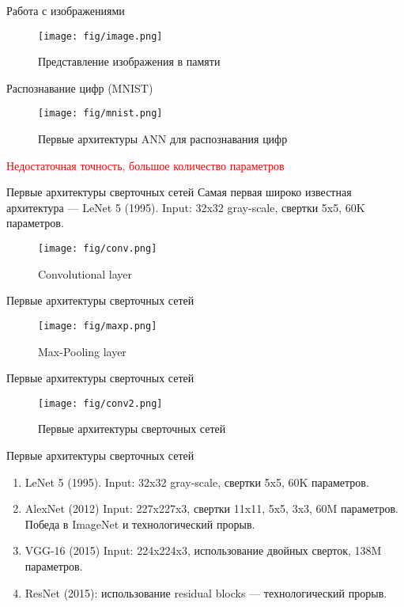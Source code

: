 \documentclass[handout]{beamer}
\begin{document}
\begin{frame}{Работа с изображениями}
	\begin{figure}
	    \texttt{[image: fig/image.png]}
	    \caption{\small Представление изображения в памяти
	    } 
	    \label{fig:w_series}
	\end{figure}
\end{frame}

\begin{frame}{Распознавание цифр (MNIST)}
	\begin{figure}
	    \texttt{[image: fig/mnist.png]}
	    \caption{\small Первые архитектуры ANN для распознавания цифр
	    } 
	    \label{fig:w_series}
	\end{figure}
	\vspace*{-10pt}
	\textcolor{red}{Недостаточная точность, большое количество параметров}
\end{frame}

\begin{frame}{Первые архитектуры сверточных сетей}
	Самая первая широко известная архитектура --- LeNet 5 (1995). Input: 32x32 gray-scale, свертки 5x5, 60K параметров.
	\begin{figure}
	    \texttt{[image: fig/conv.png]}
	    \caption{\small Convolutional layer
	    } 
	    \label{fig:w_series}
	\end{figure}
\end{frame}

\begin{frame}{Первые архитектуры сверточных сетей}
	\begin{figure}
	    \texttt{[image: fig/maxp.png]}
	    \caption{\small Max-Pooling layer
	    } 
	    \label{fig:w_series}
	\end{figure}
\end{frame}

\begin{frame}{Первые архитектуры сверточных сетей}
	\begin{figure}
	    \texttt{[image: fig/conv2.png]}
	    \caption{\small Первые архитектуры сверточных сетей
	    } 
	    \label{fig:w_series}
	\end{figure}
\end{frame}

\begin{frame}{Первые архитектуры сверточных сетей}
	\begin{enumerate}
		\item LeNet 5 (1995). Input: 32x32 gray-scale, свертки 5x5, 60K параметров.
		\item AlexNet (2012) Input: 227x227x3, свертки 11x11, 5x5, 3x3, 60M параметров. Победа в ImageNet и технологический прорыв.
		\item VGG-16 (2015) Input: 224x224x3, использование двойных сверток, 138M параметров.
		\item ResNet (2015): использование residual blocks --- технологический прорыв.
	\end{enumerate}
	
\end{frame}
\end{document}
